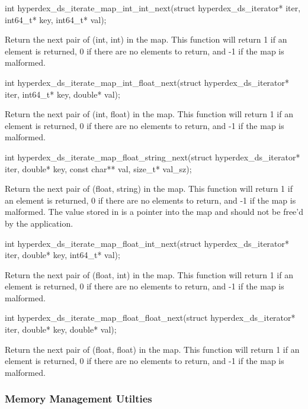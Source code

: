 \begin{ccode}
int hyperdex_ds_iterate_map_int_int_next(struct hyperdex_ds_iterator* iter,
                                         int64_t* key, int64_t* val);
\end{ccode}
Return the next pair of (int, int) in the map.  This function will
return 1 if an element is returned, 0 if there are no elements to return, and -1
if the map is malformed.

\begin{ccode}
int hyperdex_ds_iterate_map_int_float_next(struct hyperdex_ds_iterator* iter,
                                           int64_t* key, double* val);
\end{ccode}
Return the next pair of (int, float) in the map.  This function will
return 1 if an element is returned, 0 if there are no elements to return, and -1
if the map is malformed.

\begin{ccode}
int hyperdex_ds_iterate_map_float_string_next(struct hyperdex_ds_iterator* iter,
                                              double* key,
                                              const char** val, size_t* val_sz);
\end{ccode}
Return the next pair of (float, string) in the map.  This function
will return 1 if an element is returned, 0 if there are no elements to return,
and -1 if the map is malformed.  The value stored in  is a pointer
into the map and should not be free'd by the application.

\begin{ccode}
int hyperdex_ds_iterate_map_float_int_next(struct hyperdex_ds_iterator* iter,
                                           double* key, int64_t* val);
\end{ccode}
Return the next pair of (float, int) in the map.  This function will
return 1 if an element is returned, 0 if there are no elements to return, and -1
if the map is malformed.

\begin{ccode}
int hyperdex_ds_iterate_map_float_float_next(struct hyperdex_ds_iterator* iter,
                                             double* key, double* val);
\end{ccode}
Return the next pair of (float, float) in the map.  This function will
return 1 if an element is returned, 0 if there are no elements to return, and -1
if the map is malformed.

\subsubsection{Memory Management Utilties}
\label{sec:api:c:client:memory}

